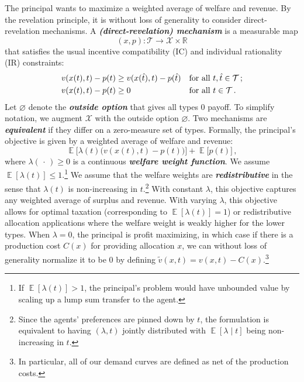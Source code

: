 \documentclass[12pt,letterpaper]{article}
\newenvironment{original}{\color{black}\noindent}{}
\theoremstyle{plain}
\theoremstyle{definition}
\theoremstyle{remark}
\let\emptyset\varnothing
\DeclareMathOperator{\E}{\mathds{E}}
\newcommand{\R}{\mathds{R}}
\renewcommand{\1}{\mathds{1}}
\newcommand{\X}{\mathcal{X}}
\theoremstyle{definition}
\begin{document}
\begin{original}
The principal wants to maximize a weighted average of welfare and revenue. By the revelation principle, it is without loss of generality to consider direct-revelation mechanisms. A \textit{\textbf{(direct-revelation) mechanism}} is a measurable map
\[(x, p): \mathcal{T} \rightarrow \mathcal{X} \times \R \]
that satisfies the usual incentive compatibility (IC) and individual rationality (IR) constraints:
\begin{align*}
    v(x(t), t) - p(t) &\geq     v(x(\hat{t}), t) - p(\hat{t})  &&\text{for all $t, \hat{t} \in \mathcal{T}$\,;} \\
   v(x(t), t) - p(t) &\geq    0  &&\text{for all $t \in \mathcal{T}$}\,.
\end{align*}
Let $\emptyset$ denote the \textit{\textbf{outside option}} that gives all types $0$ payoff. To simplify notation, we augment $\X$ with the outside option $\emptyset$. Two mechanisms are \textit{\textbf{equivalent}} if they differ on a zero-measure set of types. Formally, the principal's objective is given by a weighted average of welfare and revenue:
\[\E\big[\lambda (t) \big(v(x(t), t) - p(t)\big)\big] + \E\big[p(t)\big]\,,\]
where $\lambda(\,\cdot\,) \geq 0$ is a continuous \textit{\textbf{welfare weight function}}.
We assume $\E[\lambda(t)] \leq 1$.\footnote{If $\E[\lambda(t)] > 1$, the principal's problem would have unbounded value by scaling up a lump sum transfer to the agent.} We assume that the welfare weights are \textit{\textbf{redistributive}} in the sense that $\lambda(t)$ is non-increasing in $t$.\footnote{Since the agents' preferences are pinned down by $t$, the formulation is equivalent to having $(\lambda, t)$ jointly distributed with $\E[\lambda \mid t]$ being non-increasing in $t$.} With constant $\lambda$, this objective captures any weighted average of surplus and revenue. With varying $\lambda$, this objective allows for optimal taxation (corresponding to $\E[\lambda(t)] = 1$) or redistributive allocation applications where the welfare weight is weakly higher for the lower types. When $\lambda = 0$, the principal is profit maximizing, in which case if there is a production cost $C(x)$ for providing allocation $x$, we can without loss of generality normalize it to be $0$ by defining $\tilde{v}(x, t) = v(x, t) - C(x)$.\footnote{In particular, all of our demand curves are defined as net of the production costs.}
\end{original}
\end{document}
